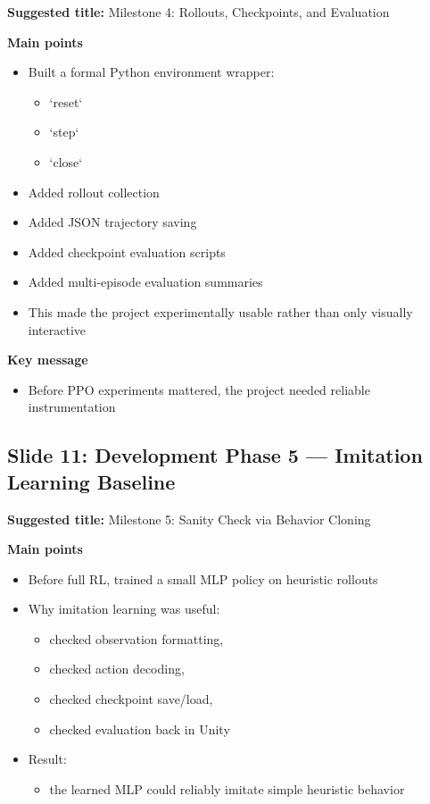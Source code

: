 \documentclass[11pt]{article}
\begin{document}
\textbf{Suggested title:} Milestone 4: Rollouts, Checkpoints, and Evaluation

\textbf{Main points}
\begin{itemize}
    \item Built a formal Python environment wrapper:
    \begin{itemize}
        \item `reset`
        \item `step`
        \item `close`
    \end{itemize}
    \item Added rollout collection
    \item Added JSON trajectory saving
    \item Added checkpoint evaluation scripts
    \item Added multi-episode evaluation summaries
    \item This made the project experimentally usable rather than only visually interactive
\end{itemize}

\textbf{Key message}
\begin{itemize}
    \item Before PPO experiments mattered, the project needed reliable instrumentation
\end{itemize}

\subsection*{Slide 11: Development Phase 5 --- Imitation Learning Baseline}

\textbf{Suggested title:} Milestone 5: Sanity Check via Behavior Cloning

\textbf{Main points}
\begin{itemize}
    \item Before full RL, trained a small MLP policy on heuristic rollouts
    \item Why imitation learning was useful:
    \begin{itemize}
        \item checked observation formatting,
        \item checked action decoding,
        \item checked checkpoint save/load,
        \item checked evaluation back in Unity
    \end{itemize}
    \item Result:
    \begin{itemize}
        \item the learned MLP could reliably imitate simple heuristic behavior
    \end{itemize}
\end{itemize}
\end{document}
